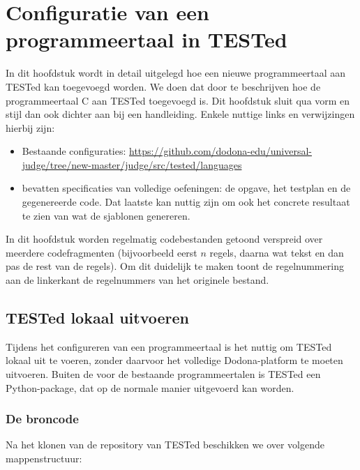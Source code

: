 \chapter{Configuratie van een programmeertaal in TESTed}\label{ch:nieuwe-taal}

In dit hoofdstuk wordt in detail uitgelegd hoe een nieuwe programmeertaal aan TESTed kan toegevoegd worden.
We doen dat door te beschrijven hoe de programmeertaal C aan TESTed toegevoegd is.
Dit hoofdstuk sluit qua vorm en stijl dan ook dichter aan bij een handleiding.
Enkele nuttige links en verwijzingen hierbij zijn:

\begin{itemize}
    \item Bestaande configuraties: \url{https://github.com/dodona-edu/universal-judge/tree/new-master/judge/src/tested/languages}
    \item {} bevatten specificaties van volledige oefeningen: de opgave, het testplan en de gegenereerde code.
    Dat laatste kan nuttig zijn om ook het concrete resultaat te zien van wat de sjablonen genereren.
\end{itemize}

In dit hoofdstuk worden regelmatig codebestanden getoond verspreid over meerdere codefragmenten (bijvoorbeeld eerst $n$ regels, daarna wat tekst en dan pas de rest van de regels).
Om dit duidelijk te maken toont de regelnummering aan de linkerkant de regelnummers van het originele bestand. 

\section{TESTed lokaal uitvoeren}\label{sec:tested-lokaal-uitvoeren}

Tijdens het configureren van een programmeertaal is het nuttig om TESTed lokaal uit te voeren, zonder daarvoor het volledige Dodona-platform te moeten uitvoeren.
Buiten de  voor de bestaande programmeertalen is TESTed een Python-package, dat op de normale manier uitgevoerd kan worden.

\subsection{De broncode}\label{subsec:de-broncode}

Na het klonen van de repository van TESTed beschikken we over volgende mappenstructuur:

